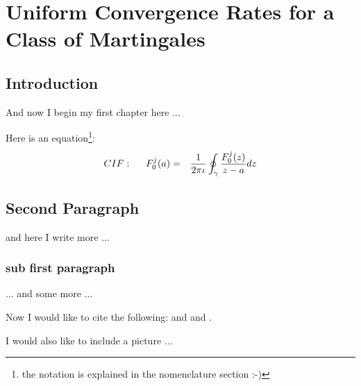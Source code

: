
\chapter{Uniform Convergence Rates for a Class of Martingales}
\ifpdf
    \graphicspath{{Chapter1/Chapter1Figs/PNG/}{Chapter1/Chapter1Figs/PDF/}{Chapter1/Chapter1Figs/}}
\else
    \graphicspath{{Chapter1/Chapter1Figs/EPS/}{Chapter1/Chapter1Figs/}}
\fi

\section{Introduction}
And now I begin my first chapter here ...

Here is an equation\footnote{the notation is explained in the nomenclature section :-)}:
\begin{eqnarray}
CIF: \hspace*{5mm}F_0^j(a) &=& \frac{1}{2\pi \iota} \oint_{\gamma} \frac{F_0^j(z)}{z - a} dz
\end{eqnarray}
\section{Second Paragraph}
and here I write more ...\cite{texbook}

\subsection{sub first paragraph}
... and some more ...

Now I would like to cite the following: \cite{latex} and \cite{texbook}
and \cite{Rud73}.

I would also like to include a picture ...

